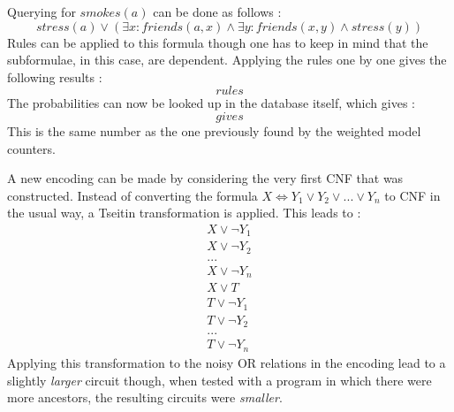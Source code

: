 Querying for $smokes(a)$ can be done as follows :
$$stress(a) \lor (\exists x: friends(a,x)\land \exists y:friends(x,y) \land stress(y))$$
Rules can be applied to this formula though one has to keep in mind that the subformulae, in this case, are dependent. Applying the rules one by one gives the following results :
$$rules$$
The probabilities can now be looked up in the database itself, which gives :
$$gives$$
This is the same number as the one previously found by the weighted model counters.


A new encoding can be made by considering the very first CNF that was constructed. Instead of converting the formula $X\Leftrightarrow Y_1\lor Y_2 \lor ... \lor Y_n$ to CNF in the usual way, a Tseitin transformation is applied. This leads to :
\begin{gather*}
X \lor \lnot Y_1\\
X \lor \lnot Y_2\\
...\\
X \lor \lnot Y_n\\
X \lor T\\
T \lor \lnot Y_1\\
T \lor \lnot Y_2\\
...\\
T \lor \lnot Y_n
\end{gather*}
Applying this transformation to the noisy OR relations in the encoding lead to a slightly \textit{larger} circuit though, when tested with a program in which there were more ancestors, the resulting circuits were \textit{smaller}.